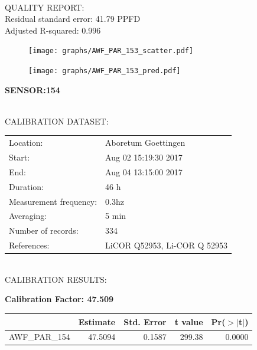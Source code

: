 \documentclass[oneside]{report}
\begin{document}
\hrulefill\\
QUALITY REPORT:\\
Residual standard error: 41.79 PPFD\\
Adjusted R-squared: 0.996



\begin{figure}[H]
  \centering
  \texttt{[image: graphs/AWF\_PAR\_153\_scatter.pdf]}
\end{figure}




\begin{figure}[H]
  \centering
  \texttt{[image: graphs/AWF\_PAR\_153\_pred.pdf]}
\end{figure}

\pagebreak


\begin{center}
\large{\textbf{SENSOR:154}}\\
\end{center}

\hrulefill\\
CALIBRATION DATASET:\\
\begin{table}[h!]
  \centering
  \label{tab:table1}
  \begin{tabular}{ll}
    Location: & Aboretum Goettingen\\ 
    
    
    Start:  & Aug 02 15:19:30 2017 \\
    End:   & Aug 04 13:15:00 2017\\ 
    Duration: & 46 h\\
    Measurement frequency: & 0.3hz\\
    Averaging:  &5 min\\
    Number of records: & 334 \\
    References: & LiCOR Q52953, Li-COR Q 52953 \\
  \end{tabular}
\end{table}

\hrulefill\\
CALIBRATION RESULTS:\\


\begin{center}
\textbf{\large{Calibration Factor: 47.509}}\\
\end{center}
\begin{table}[ht]
\centering
\begin{tabular}{rrrrr}
  \hline
 & Estimate & Std. Error & t value & Pr($>$$|$t$|$) \\ 
  \hline
AWF\_PAR\_154 & 47.5094 & 0.1587 & 299.38 & 0.0000 \\ 
   \hline
\end{tabular}
\end{table}
\end{document}
